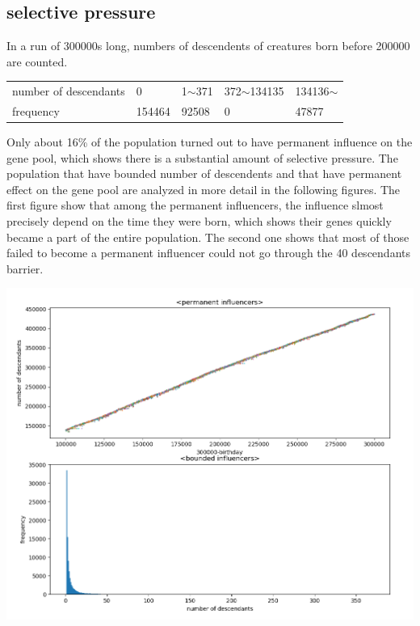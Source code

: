 \documentclass{article}
\numberwithin{equation}{section}
\begin{document}
\subsection{selective pressure}
In a run of 300000s long, numbers of descendents of creatures born before 200000 are counted. 
\begin{table}[htb]
\begin{tabular}{lllll}
number of descendants&0&1$\sim$371&372$\sim$134135&134136$\sim$\\
frequency&154464&92508&0&47877
\end{tabular}
\end{table}
Only about 16\% of the population turned out to have permanent influence on the gene pool, which shows there is a substantial amount of selective pressure. The population that have bounded number of descendents and that have permanent effect on the gene pool are analyzed in more detail in the following figures. The first figure show that among the permanent influencers, the influence slmost precisely depend on the time they were born, which shows their genes quickly became a part of the entire population. The second one shows that most of those failed to become a permanent influencer could not go through the 40 descendants barrier.
\begin{center}
\includegraphics[scale=0.3]{images/detail.png}
\end{center}





\end{document}
